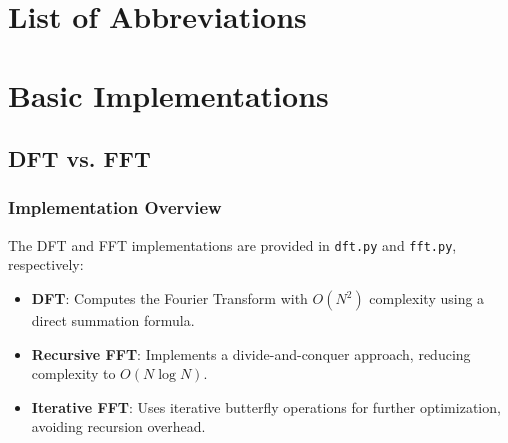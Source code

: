 \documentclass[12pt, a4paper]{report}
\begin{document}



\renewcommand{\contentsname}{Table of Contents}
\tableofcontents %
\newpage


\chapter*{List of Abbreviations}
\label{sec:abkuerzungsverzeichnis}
\begin{acronym}[OpenCV]
\end{acronym}
\newpage

\renewcommand{\listfigurename}{List of Figures}
\listoffigures
\newpage



\setcounter{page}{1}	%

\chapter{Basic Implementations}

\section{\ac{DFT} vs. \ac{FFT}}

\subsection{Implementation Overview}
The \ac{DFT} and \ac{FFT} implementations are provided in \texttt{dft.py} and \texttt{fft.py}, respectively:
\begin{itemize}
	\item \textbf{\ac{DFT}}: Computes the Fourier Transform with \(O(N^2)\) complexity using a direct summation formula.
	\item \textbf{Recursive FFT}: Implements a divide-and-conquer approach, reducing complexity to \(O(N \log N)\).
	\item \textbf{Iterative FFT}: Uses iterative butterfly operations for further optimization, avoiding recursion overhead.
\end{itemize}
\end{document}
